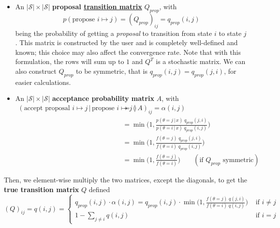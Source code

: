  \begin{itemize}
    \item An $|\mathcal{S}| \times |\mathcal{S}|$ \textbf{proposal \hyperref[sp-def:transition-matrix]{transition matrix}} $Q_{prop}$, with
    \begin{equation}
      p(\text{propose } i \mapsto j) = (Q_{prop})_{ij} = q_{prop} (i, j)
    \end{equation}
    being the probability of getting a \textit{proposal} to transition from state $i$ to state $j$. This matrix is constructed by the user and is completely well-defined and known; this choice may also affect the convergence rate. Note that with this formulation, the rows will sum up to $1$ and $Q^T$ is a stochastic matrix. We can also construct $Q_{prop}$ to be symmetric, that is $q_{prop}(i, j) = q_{prop} (j, i)$, for easier calculations.

    \item An $|\mathcal{S}| \times |\mathcal{S}|$ \textbf{acceptance probability matrix} $A$, with
    \begin{align*}
      (\text{accept proposal }i \mapsto j\,|\, \text{propose } i \mapsto j) & = (A)_{ij} = \alpha(i, j) \\
      & = \min \bigg(1, \frac{p(\theta = j \,|\, x)\; q_{prop}(j, i)}{p(\theta = i\,|\, x) \; q_{prop}(i, j)} \bigg) \\
      & = \min\bigg(1, \frac{f(\theta = j) \; q_{prop}(j, i)}{f(\theta = i) \; q_{prop}(i, j)} \bigg) \\
      & = \min\bigg(1, \frac{f(\theta = j)}{f(\theta = i)} \bigg) \;\;\;\;\;\;\; (\text{if } Q_{prop} \text{ symmetric})
    \end{align*}
  \end{itemize}

  Then, we element-wise multiply the two matrices, except the diagonals, to get the \textbf{true transition matrix} $Q$ defined
  \begin{equation}
    (Q)_{ij} = q(i, j) = \begin{cases}
      q_{prop} (i, j) \cdot \alpha (i, j) = q_{prop}(i, j) \cdot \min\bigg(1, \frac{f(\theta = j) \; q(j, i)}{f(\theta = i) \; q(i, j)} \bigg) & \text{ if } i \neq j \\
      1 - \sum_{j \neq i} q(i, j) & \text{ if } i = j
    \end{cases}
  \end{equation}

